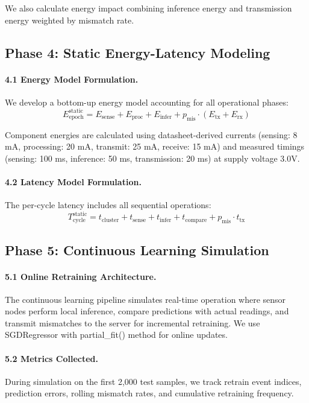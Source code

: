 \documentclass[12pt,a4paper]{article}
\begin{document}
We also calculate energy impact combining inference energy and transmission energy weighted by mismatch rate.

\subsection{Phase 4: Static Energy-Latency Modeling}

\paragraph{4.1 Energy Model Formulation.}
We develop a bottom-up energy model accounting for all operational phases:
\[
  E_{\text{epoch}}^{\text{static}} = E_{\text{sense}} + E_{\text{proc}} + E_{\text{infer}} + p_{\text{mis}} \cdot (E_{\text{tx}} + E_{\text{rx}})
\]

Component energies are calculated using datasheet-derived currents (sensing: 8 mA, processing: 20 mA, transmit: 25 mA, receive: 15 mA) and measured timings (sensing: 100 ms, inference: 50 ms, transmission: 20 ms) at supply voltage 3.0V.

\paragraph{4.2 Latency Model Formulation.}
The per-cycle latency includes all sequential operations:
\[
  T_{\text{cycle}}^{\text{static}} = t_{\text{cluster}} + t_{\text{sense}} + t_{\text{infer}} + t_{\text{compare}} + p_{\text{mis}} \cdot t_{\text{tx}}
\]

\subsection{Phase 5: Continuous Learning Simulation}

\paragraph{5.1 Online Retraining Architecture.}
The continuous learning pipeline simulates real-time operation where sensor nodes perform local inference, compare predictions with actual readings, and transmit mismatches to the server for incremental retraining. We use SGDRegressor with partial\_fit() method for online updates.

\paragraph{5.2 Metrics Collected.}
During simulation on the first 2,000 test samples, we track retrain event indices, prediction errors, rolling mismatch rates, and cumulative retraining frequency.
\end{document}
